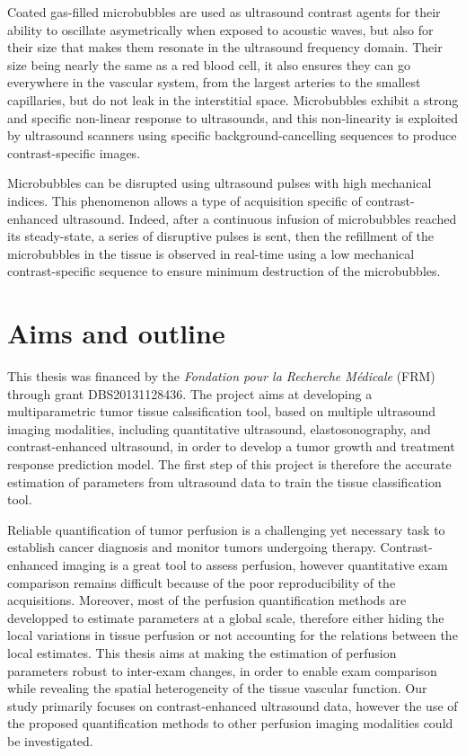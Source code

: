 Coated gas-filled microbubbles are used as ultrasound contrast agents for their ability to oscillate asymetrically when exposed to acoustic waves, but also for their size that makes them resonate in the ultrasound frequency domain.
Their size being nearly the same as a red blood cell, it also ensures they can go everywhere in the vascular system, from the largest arteries to the smallest capillaries, but do not leak in the interstitial space.
Microbubbles exhibit a strong and specific non-linear response to ultrasounds, and this non-linearity is exploited by ultrasound scanners using specific background-cancelling sequences to produce contrast-specific images.

Microbubbles can be disrupted using ultrasound pulses with high mechanical indices.
This phenomenon allows a type of acquisition specific of contrast-enhanced ultrasound. 
Indeed, after a continuous infusion of microbubbles reached its steady-state, a series of disruptive pulses is sent, then the refillment of the microbubbles in the tissue is observed in real-time using a low mechanical contrast-specific sequence to ensure minimum destruction of the microbubbles.


\section{Aims and outline}
\label{sec:IntroAimsOutline}
This thesis was financed by the {\em Fondation pour la Recherche M\'edicale} (FRM) through grant DBS20131128436.
The project aims at developing a multiparametric tumor tissue calssification tool, based on multiple ultrasound imaging modalities, including quantitative ultrasound, elastosonography, and contrast-enhanced ultrasound, in order to develop a tumor growth and treatment response prediction model.
The first step of this project is therefore the accurate estimation of parameters from ultrasound data to train the tissue classification tool.

Reliable quantification of tumor perfusion is a challenging yet necessary task to establish cancer diagnosis and monitor tumors undergoing therapy.
Contrast-enhanced imaging is a great tool to assess perfusion, however quantitative exam comparison remains difficult because of the poor reproducibility of the acquisitions.
Moreover, most of the perfusion quantification methods are developped to estimate parameters at a global scale, therefore either hiding the local variations in tissue perfusion or not accounting for the relations between the local estimates.
This thesis aims at making the estimation of perfusion parameters robust to inter-exam changes, in order to enable exam comparison while revealing the spatial heterogeneity of the tissue vascular function.
Our study primarily focuses on contrast-enhanced ultrasound data, however the use of the proposed quantification methods to other perfusion imaging modalities could be investigated.

\newpage


